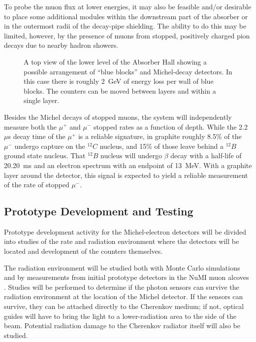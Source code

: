To probe the muon flux at lower energies, it may also
be feasible and/or desirable to place some additional modules within
the downstream part of the absorber or in the outermost radii of the
decay-pipe shielding. The ability to do this may be limited, however,
by the presence of muons from stopped, positively charged pion decays
due to nearby hadron showers.


\begin{figure}[htbp]
\begin{center}
\caption[Arrangement of blue blocks and Michel-decay detectors]{A top view of the 
lower level of the Absorber Hall showing a possible arrangement of ``blue blocks'' 
and Michel-decay detectors. In this case there is roughly 2~GeV of energy loss 
per wall of blue blocks. The counters can be moved between layers and within a single layer.}
\label{fig:StoppedMuonLayout}
\end{center}
\end{figure}

Besides the Michel decays of stopped muons, the system will
independently measure both the $\mu ^{+}$ and $\mu ^{-}$ stopped
rates as a function of depth. 
While the 2.2~$\mu $s decay time of the $\mu^+$ is a reliable
signature, in graphite roughly 8.5\% of the $\mu^{-}$ undergo capture
on the $^{12}C$ nucleus, and 15\% of those leave behind a $^{12}B$
ground state nucleus. That $^{12}B$ nucleus will undergo $\beta$ decay
with a half-life of 20.20~ms and an electron spectrum with an endpoint
of 13~MeV. With a graphite layer around the detector, this signal is
expected to yield a reliable measurement of the rate of stopped
$\mu^{-}$.

\subsection{Prototype Development and Testing}

Prototype development activity for the Michel-electron detectors will
be divided into studies of the rate and radiation environment where
the detectors will be located and development of the counters
themselves.

The radiation environment will be studied both with Monte Carlo 
simulations and by
measurements from initial prototype detectors in the NuMI muon alcoves
\cite{ref:NuMIBeamMonitors}.
Studies will be performed to determine if the photon sensors
can survive the radiation environment at the location of the Michel
detector. If the sensors can survive, they can be attached directly to
the Cherenkov medium; if not, optical guides will have to bring the
light to a lower-radiation area to the side of the beam. Potential
radiation damage to the Cherenkov radiator itself will also be
studied.

